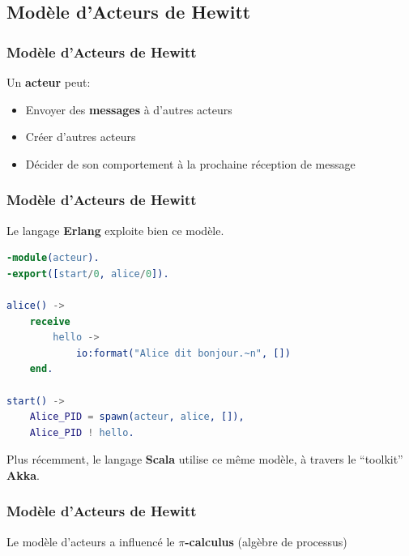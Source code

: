 \documentclass{beamer}
\begin{document}
\subsection{Modèle d'Acteurs de Hewitt}
\begin{frame}[fragile]
  \frametitle{Modèle d'Acteurs de Hewitt}
  Un \textbf{acteur} peut:
  \begin{itemize}
  \item Envoyer des \textbf{messages} à d'autres acteurs
  \item Créer d'autres acteurs
  \item Décider de son comportement à la prochaine réception de message
  \end{itemize}
\end{frame}
\begin{frame}[fragile]
  \frametitle{Modèle d'Acteurs de Hewitt}
  Le langage \textbf{Erlang} exploite bien ce modèle.
  \begin{center}
\begin{lstlisting}[language=erlang]
-module(acteur).
-export([start/0, alice/0]).

alice() ->
    receive
        hello ->
            io:format("Alice dit bonjour.~n", [])
    end.

start() ->
    Alice_PID = spawn(acteur, alice, []),
    Alice_PID ! hello.
\end{lstlisting}
\end{center}
  Plus récemment, le langage \textbf{Scala} utilise ce même modèle, à travers le
  ``toolkit'' \textbf{Akka}.
\end{frame}
\begin{frame}
  \frametitle{Modèle d'Acteurs de Hewitt}
  Le modèle d'acteurs a influencé le \textbf{$\pi$-calculus} (algèbre de processus)
  \par\bigskip
\end{frame}
\end{document}
